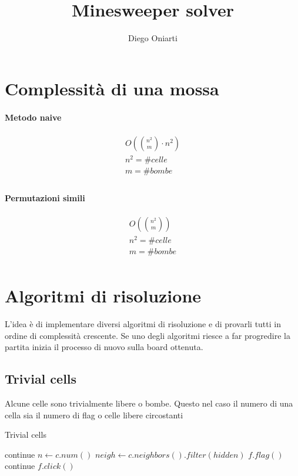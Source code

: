 \documentclass{article}
\title{Minesweeper solver}
\author{Diego Oniarti}
\date{}
\begin{document}
\maketitle

\section{Complessità di una mossa}
\paragraph {Metodo naive}
\begin{gather*}
    O\left( \binom{n^2}{m} \cdot n^2 \right) \\
    n^2 = \#celle  \\
    m = \#bombe \\
\end{gather*}

\paragraph {Permutazioni simili}
\begin{gather*}
    O\left( \binom{n^2}{m} \right) \\
    n^2 = \#celle  \\ 
    m = \#bombe \\
\end{gather*}

\newpage

\section{Algoritmi di risoluzione}
L'idea è di implementare diversi algoritmi di risoluzione e di provarli tutti in ordine di complessità crescente. Se uno degli algoritmi riesce a far progredire la partita inizia il processo di nuovo sulla board ottenuta.

\subsection{Trivial cells}
Alcune celle sono trivialmente libere o bombe. Questo nel caso il numero di una cella sia il numero di flag o celle libere circostanti
\begin{algorithm}
    \caption{Trivial cells}
    \label{algo:trivial}
     {
         {
            continue\;
        }
        $n \gets c.num()$\;
        $neigh \gets c.neighbors().filter(hidden)$\;
         {
             {
                $f.flag()$\;
            }
            continue\;
        }
         {
             {
                $f.click()$
            }
        }
    }
\end{algorithm}
\end{document}
